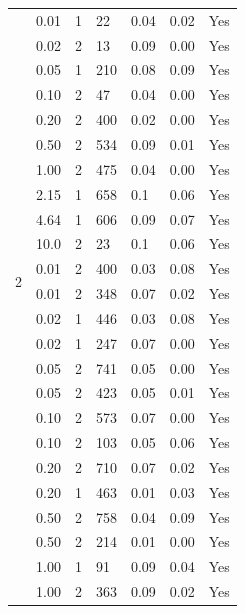 \begin{longtable}{ | M{2.0cm} | M{2.0cm} | M{1.5cm} | M{1.5cm} | M{2.0cm} | M{2.0cm} | M{1.5cm} | }
\hline
\endlastfoot
          & 0.01 & 1 & 22  & 0.04 & 0.02 & Yes \\
                 & 0.02 & 2 & 13  & 0.09 & 0.00 & Yes \\
                 & 0.05 & 1 & 210 & 0.08 & 0.09 & Yes \\
                 & 0.10 & 2 & 47  & 0.04 & 0.00 & Yes \\
                 & 0.20 & 2 & 400 & 0.02 & 0.00 & Yes \\
                 & 0.50 & 2 & 534 & 0.09 & 0.01 & Yes \\
                 & 1.00 & 2 & 475 & 0.04 & 0.00 & Yes \\
                 & 2.15 & 1 & 658 & 0.1  & 0.06 & Yes \\
                 & 4.64 & 1 & 606 & 0.09 & 0.07 & Yes \\
                 & 10.0 & 2 & 23  & 0.1  & 0.06 & Yes \\
         \hline
          & 0.01 & 2 & 400 & 0.03 & 0.08 & Yes \\
                 & 0.01 & 2 & 348 & 0.07 & 0.02 & Yes \\
                 & 0.02 & 1 & 446 & 0.03 & 0.08 & Yes \\
                 & 0.02 & 1 & 247 & 0.07 & 0.00 & Yes \\
                 & 0.05 & 2 & 741 & 0.05 & 0.00 & Yes \\
                 & 0.05 & 2 & 423 & 0.05 & 0.01 & Yes \\
                 & 0.10 & 2 & 573 & 0.07 & 0.00 & Yes \\
                 & 0.10 & 2 & 103 & 0.05 & 0.06 & Yes \\
                 & 0.20 & 2 & 710 & 0.07 & 0.02 & Yes \\
                 & 0.20 & 1 & 463 & 0.01 & 0.03 & Yes \\
                 & 0.50 & 2 & 758 & 0.04 & 0.09 & Yes \\
                 & 0.50 & 2 & 214 & 0.01 & 0.00 & Yes \\
                 & 1.00 & 1 & 91  & 0.09 & 0.04 & Yes \\
                 & 1.00 & 2 & 363 & 0.09 & 0.02 & Yes \\

\end{longtable}
